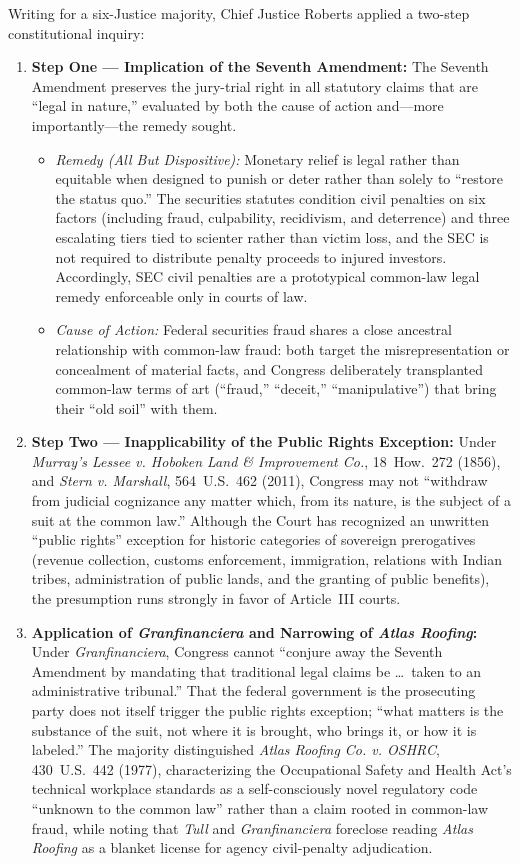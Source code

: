 \documentclass[12pt]{article}
\begin{document}
Writing for a six-Justice majority, Chief Justice Roberts applied a two-step constitutional inquiry:
\begin{enumerate}
  \item \textbf{Step One --- Implication of the Seventh Amendment:} The Seventh Amendment preserves the jury-trial right in all statutory claims that are ``legal in nature,'' evaluated by both the cause of action and---more importantly---the remedy sought.
  \begin{itemize}
    \item \textit{Remedy (All But Dispositive):} Monetary relief is legal rather than equitable when designed to punish or deter rather than solely to ``restore the status quo.'' The securities statutes condition civil penalties on six factors (including fraud, culpability, recidivism, and deterrence) and three escalating tiers tied to scienter rather than victim loss, and the SEC is not required to distribute penalty proceeds to injured investors. Accordingly, SEC civil penalties are a prototypical common-law legal remedy enforceable only in courts of law.
    \item \textit{Cause of Action:} Federal securities fraud shares a close ancestral relationship with common-law fraud: both target the misrepresentation or concealment of material facts, and Congress deliberately transplanted common-law terms of art (``fraud,'' ``deceit,'' ``manipulative'') that bring their ``old soil'' with them.
  \end{itemize}
  \item \textbf{Step Two --- Inapplicability of the Public Rights Exception:} Under \textit{Murray's Lessee v. Hoboken Land \& Improvement Co.}, 18~How.~272 (1856), and \textit{Stern v. Marshall}, 564~U.S.~462 (2011), Congress may not ``withdraw from judicial cognizance any matter which, from its nature, is the subject of a suit at the common law.'' Although the Court has recognized an unwritten ``public rights'' exception for historic categories of sovereign prerogatives (revenue collection, customs enforcement, immigration, relations with Indian tribes, administration of public lands, and the granting of public benefits), the presumption runs strongly in favor of Article~III courts.
  \item \textbf{Application of \textit{Granfinanciera} and Narrowing of \textit{Atlas Roofing}:} Under \textit{Granfinanciera}, Congress cannot ``conjure away the Seventh Amendment by mandating that traditional legal claims be \ldots\ taken to an administrative tribunal.'' That the federal government is the prosecuting party does not itself trigger the public rights exception; ``what matters is the substance of the suit, not where it is brought, who brings it, or how it is labeled.'' The majority distinguished \textit{Atlas Roofing Co. v. OSHRC}, 430~U.S.~442 (1977), characterizing the Occupational Safety and Health Act's technical workplace standards as a self-consciously novel regulatory code ``unknown to the common law'' rather than a claim rooted in common-law fraud, while noting that \textit{Tull} and \textit{Granfinanciera} foreclose reading \textit{Atlas Roofing} as a blanket license for agency civil-penalty adjudication.
\end{enumerate}
\end{document}
